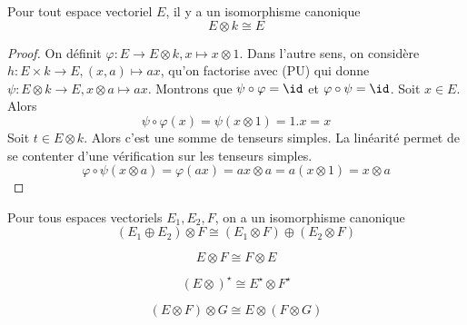 \begin{prop}
Pour tout espace vectoriel $E$, il y a un isomorphisme canonique  \[
E\otimes k\cong E
\]
\end{prop}

\begin{proof}
    On définit $\varphi:E \longrightarrow E\otimes k, x\longmapsto x\otimes 1$. Dans l'autre sens, on considère $h:E\times k \longrightarrow E, (x, a)\longmapsto ax$, qu'on factorise avec (PU) qui donne $\psi:E\otimes k \longrightarrow E, x\otimes a \longmapsto ax$. Montrons que $\psi\circ \varphi=\id$ et  $\varphi\circ \psi=\id$. Soit  $x \in  E$. Alors \[
        \psi\circ \varphi(x)=\psi(x\otimes 1)=1.x=x
    \]
    Soit $t \in  E\otimes k$. Alors  c'est une somme de tenseurs simples. La linéarité permet de se contenter d'une vérification sur les tenseurs simples. \[
        \varphi\circ \psi(x\otimes a)=\varphi(ax)=ax\otimes a=a(x\otimes 1)=x\otimes a
    \]
\end{proof}

\begin{prop}
Pour tous espaces vectoriels $E_1, E_2, F$, on a un isomorphisme canonique \[
    (E_1\oplus E_2)\otimes F\cong (E_1\otimes F)\oplus(E_2\otimes F)
\] 
\end{prop}

\begin{prop}
 \[
E\otimes F\cong F\otimes E
\] 
\end{prop}

\begin{prop}
\[
    (E\otimes)^\star \cong E^\star \otimes F^\star
\] 
\end{prop}

\begin{prop}
    \[
        (E\otimes F)\otimes G \cong E\otimes(F\otimes G)
    \] 
\end{prop}
